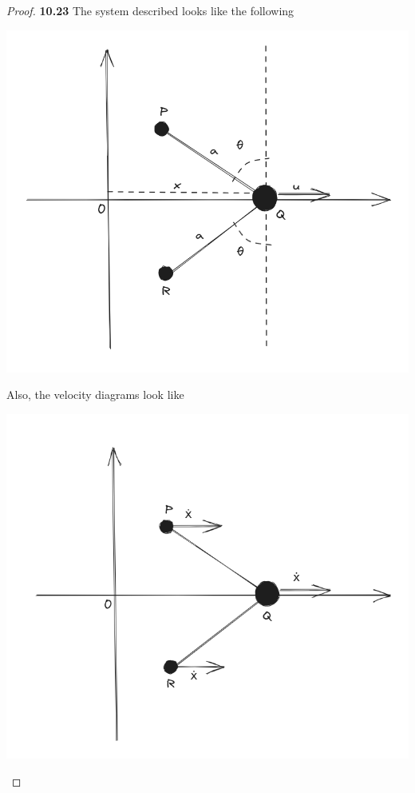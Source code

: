 \documentclass[11pt]{article}
\theoremstyle{definition}
\begin{document}
	\begin{proof}{\textbf{10.23}}
    The system described looks like the following    
    \begin{center}
        \includegraphics[scale=0.4]{ch10-23.png}
    \end{center}
    Also, the velocity diagrams look like
    \begin{center}
        \includegraphics[scale=0.3]{ch10-23-1.png}

\end{center}
\end{proof}
\end{document}
